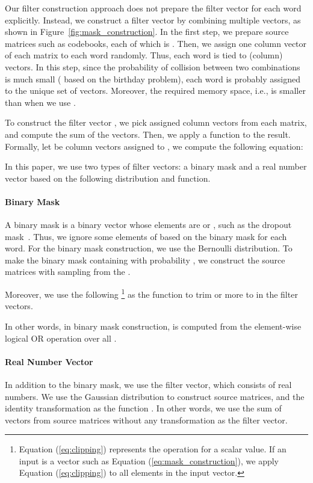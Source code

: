 \documentclass{article}
\begin{document}
Our filter construction approach does not prepare the filter vector for each word explicitly.
Instead, we construct a filter vector by combining multiple vectors, as shown in Figure~\ref{fig:mask_construction}.
In the first step, we prepare  source matrices such as codebooks, each of which is .
Then, we assign one column vector of each matrix to each word randomly.
Thus, each word is tied to  (column) vectors.
In this step, since the probability of collision between two combinations is much small ( based on the birthday problem), each word is probably assigned to the unique set of  vectors.
Moreover, the required memory space, i.e.,  is smaller than  when we use .


To construct the filter vector , we pick assigned column vectors from each matrix, and compute the sum of the vectors.
Then, we apply a function  to the result.
Formally, let  be column vectors assigned to , we compute the following equation: 

In this paper, we use two types of filter vectors: a binary mask and a real number vector based on the following distribution and function.


\paragraph{Binary Mask}
A binary mask is a binary vector whose elements are  or , such as the dropout mask~\cite{JMLR:v15:srivastava14a}.
Thus, we ignore some elements of  based on the binary mask for each word.
For the binary mask construction, we use the Bernoulli distribution.
To make the binary mask containing  with probability , we construct the source matrices with sampling from the .


Moreover, we use the following \footnote{Equation (\ref{eq:clipping}) represents the operation for a scalar value. If an input is a vector such as Equation (\ref{eq:mask_construction}), we apply Equation (\ref{eq:clipping}) to all elements in the input vector.} as the function  to trim  or more to  in the filter vectors.

In other words, in binary mask construction,  is computed from the element-wise logical OR operation over all .


\paragraph{Real Number Vector}
In addition to the binary mask, we use the filter vector, which consists of real numbers.
We use the Gaussian distribution to construct source matrices, and the identity transformation as the function .
In other words, we use the sum of vectors from source matrices without any transformation as the filter vector.
\end{document}
